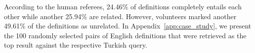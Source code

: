 According to the human referees, 24.46\% of definitions completely entails each other while another 25.94\% are related.
However, volunteers marked another 49.61\% of the definitions as unrelated.
In Appendix~\ref{app:case_study}, we present the 100 randomly selected pairs of English definitions that were retrieved as the top result against the respective Turkish query.
